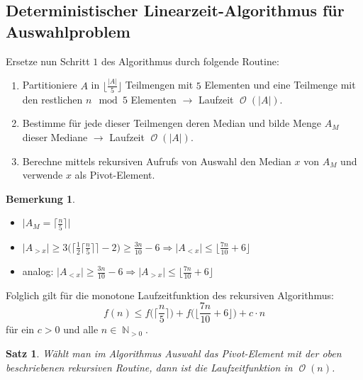\documentclass[a4paper,12pt]{article}
\DeclareMathOperator{\N}{\mathbb N}
\DeclareMathOperator{\BigO}{\mathcal O}
\newtheorem{satz}[axiom]{Satz}
\theoremstyle{definition}
\newtheorem*{bemerkung}{Bemerkung}
\begin{document}
	\subsection{Deterministischer Linearzeit-Algorithmus für Auswahlproblem}
	Ersetze nun Schritt $1$ des Algorithmus durch folgende Routine:
	\begin{enumerate}[label=(\roman*)]
		\item Partitioniere $A$ in $\lfloor \frac{\lvert A\rvert}{5}\rfloor$ Teilmengen mit $5$ Elementen und eine Teilmenge mit den restlichen $n \mod 5$ Elementen $\longrightarrow$ Laufzeit $\BigO(\lvert A\rvert)$.
		\item Bestimme für jede dieser Teilmengen deren Median und bilde Menge $A_M$ dieser Mediane $\longrightarrow$ Laufzeit $\BigO(\lvert A\rvert)$.
		\item Berechne mittels rekursiven Aufrufs von Auswahl den Median $x$ von $A_M$ und verwende $x$ als Pivot-Element.
	\end{enumerate}
	\begin{bemerkung}
		~
		\begin{itemize}
			\item $\lvert A_M = \lceil \frac{n}{5} \rceil \rvert$
			\item $\lvert A_{>x}\rvert \geq 3\big(\big\lceil \frac{1}{2} \lceil \frac{n}{5}\rceil\big\rceil - 2\big) \geq \frac{3n}{10} - 6 \Longrightarrow \lvert A_{< x}\rvert \leq \lfloor \frac{7n}{10} + 6\rfloor$
			\item analog: $\lvert A_{< x}\rvert \geq \frac{3n}{10} - 6 \Longrightarrow \lvert A_{>x}\rvert \leq \lfloor \frac{7n}{10} + 6\rfloor$
		\end{itemize}
	\end{bemerkung}
	Folglich gilt für die monotone Laufzeitfunktion des rekursiven Algorithmus:
	\[
		f(n) \leq f\Big(\Big\lceil \frac{n}{5} \Big\rceil\Big) + f\Big(\Big\lfloor \frac{7n}{10} + 6\Big\rfloor\Big) + c\cdot n 
	\]
	für ein $c > 0$ und alle $n \in \N_{> 0}$.
	\begin{satz}
		Wählt man im Algorithmus \glqq Auswahl\grqq\; das Pivot-Element mit der oben beschriebenen rekursiven Routine, dann ist die Laufzeitfunktion in $\BigO(n)$.
	\end{satz}
\end{document}

